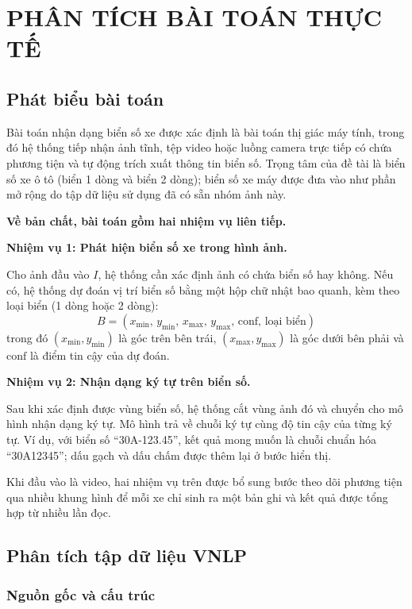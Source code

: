 \chapter{PHÂN TÍCH BÀI TOÁN THỰC TẾ}

\section{Phát biểu bài toán}

Bài toán nhận dạng biển số xe được xác định là bài toán thị giác máy tính, trong đó hệ thống tiếp nhận ảnh tĩnh, tệp video hoặc luồng camera trực tiếp có chứa phương tiện và tự động trích xuất thông tin biển số. Trọng tâm của đề tài là biển số xe ô tô (biển 1 dòng và biển 2 dòng); biển số xe máy được đưa vào như phần mở rộng do tập dữ liệu sử dụng đã có sẵn nhóm ảnh này.

\noindent\textbf{Về bản chất, bài toán gồm hai nhiệm vụ liên tiếp.}
\nopagebreak

\noindent\textbf{Nhiệm vụ 1: Phát hiện biển số xe trong hình ảnh.}
\nopagebreak

Cho ảnh đầu vào $I$, hệ thống cần xác định ảnh có chứa biển số hay không. Nếu có, hệ thống dự đoán vị trí biển số bằng một hộp chữ nhật bao quanh, kèm theo loại biển (1 dòng hoặc 2 dòng):
\[
  B = (x_{\min},\, y_{\min},\, x_{\max},\, y_{\max},\, \text{conf},\, \text{loại biển})
\]
trong đó $(x_{\min}, y_{\min})$ là góc trên bên trái, $(x_{\max}, y_{\max})$ là góc dưới bên phải và $\text{conf}$ là điểm tin cậy của dự đoán.

\noindent\textbf{Nhiệm vụ 2: Nhận dạng ký tự trên biển số.}
\nopagebreak

Sau khi xác định được vùng biển số, hệ thống cắt vùng ảnh đó và chuyển cho mô hình nhận dạng ký tự. Mô hình trả về chuỗi ký tự cùng độ tin cậy của từng ký tự. Ví dụ, với biển số ``30A-123.45'', kết quả mong muốn là chuỗi chuẩn hóa ``30A12345''; dấu gạch và dấu chấm được thêm lại ở bước hiển thị.

Khi đầu vào là video, hai nhiệm vụ trên được bổ sung bước theo dõi phương tiện qua nhiều khung hình để mỗi xe chỉ sinh ra một bản ghi và kết quả được tổng hợp từ nhiều lần đọc.

\section{Phân tích tập dữ liệu VNLP}

\subsection{Nguồn gốc và cấu trúc}

